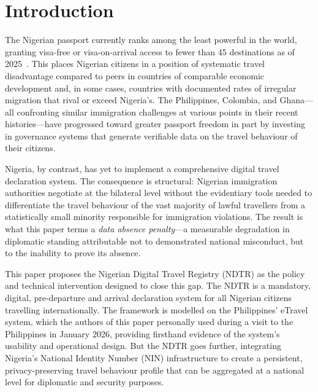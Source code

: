 \documentclass[11pt]{article}
\begin{document}
\vspace{10pt}

\section{Introduction}

The Nigerian passport currently ranks among the least powerful in the world,
granting visa-free or visa-on-arrival access to fewer than 45 destinations
as of 2025~\cite{henley2025}. This places Nigerian citizens in a position of
systematic travel disadvantage compared to peers in countries of comparable
economic development and, in some cases, countries with documented rates of
irregular migration that rival or exceed Nigeria's. The Philippines,
Colombia, and Ghana---all confronting similar immigration challenges at
various points in their recent histories---have progressed toward greater
passport freedom in part by investing in governance systems that generate
verifiable data on the travel behaviour of their citizens.

Nigeria, by contrast, has yet to implement a comprehensive digital travel
declaration system. The consequence is structural: Nigerian immigration
authorities negotiate at the bilateral level without the evidentiary tools
needed to differentiate the travel behaviour of the vast majority of
lawful travellers from a statistically small minority responsible for
immigration violations.
The result is what this paper terms a \textit{data absence penalty}---a
measurable degradation in diplomatic standing attributable not to
demonstrated national misconduct, but to the inability to prove its
absence.

This paper proposes the Nigerian Digital Travel Registry (NDTR) as the
policy and technical intervention designed to close this gap. The NDTR is
a mandatory, digital, pre-departure and arrival declaration system for all
Nigerian citizens travelling internationally. The framework is modelled on
the Philippines' eTravel system, which the authors of this paper personally
used during a visit to the Philippines in January 2026, providing firsthand
evidence of the system's usability and operational design. But the NDTR
goes further, integrating Nigeria's National Identity Number (NIN)
infrastructure to create a persistent, privacy-preserving travel behaviour
profile that can be aggregated at a national level for diplomatic and
security purposes.
\end{document}
